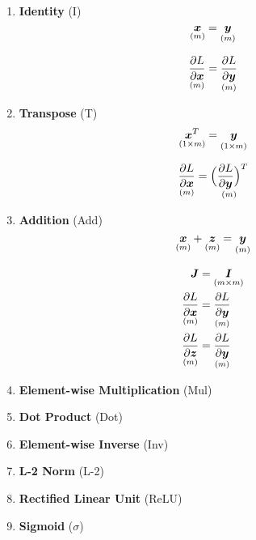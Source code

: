 \documentclass[9pt,twocolumn,times]{article}
\begin{document}
\begin{enumerate}[leftmargin=*]
\item \textbf{Identity} (I)
\begin{equation}
	\underset{(m)}{{\bm{x}}} = \underset{(m)}{{\bm{y}}}
\end{equation}
\begin{center}
	\resizebox{0.618\columnwidth}{!}{%
		
	}
\end{center}
\begin{equation}
	\underset{(m)}{\frac{\partial L}{\partial {\bm{x}}}} =
	\underset{(m)}{\frac{\partial L}{\partial {\bm{y}}}}
\end{equation}

\item \textbf{Transpose} (T)
\begin{equation}
	\underset{(1\times m)}{{\bm{x}}^T} = \underset{(1\times m)}{{\bm{y}}}
\end{equation}
\begin{center}
	\resizebox{0.618\columnwidth}{!}{%
		
	}
\end{center}
\begin{equation}
	\underset{(m)}{\frac{\partial L}{\partial {\bm{x}}}} =
	\underset{(m)}{\Big(\frac{\partial L}{\partial {\bm{y}}}\Big)^T}
\end{equation}

\item \textbf{Addition} (Add)
\begin{equation}
	\underset{(m)}{{\bm{x}}} + \underset{(m)}{{\bm{z}}} =
	\underset{(m)}{{\bm{y}}}
\end{equation}
\begin{center}
	\resizebox{0.618\columnwidth}{!}{%
		
	}
\end{center}
\begin{align}
	{\bm{J}} &= \underset{(m\times m)}{{\bm{I}}} \\
	\underset{(m)}{\frac{\partial L}{\partial {\bm{x}}}} &=
	\underset{(m)}{\frac{\partial L}{\partial {\bm{y}}}} \\
	\underset{(m)}{\frac{\partial L}{\partial {\bm{z}}}} &=
	\underset{(m)}{\frac{\partial L}{\partial {\bm{y}}}}
\end{align}

\item \textbf{Element-wise Multiplication} (Mul)

\item \textbf{Dot Product} (Dot)

\item \textbf{Element-wise Inverse} (Inv)

\item \textbf{L-2 Norm} (L-2)

\item \textbf{Rectified Linear Unit} (ReLU)

\item \textbf{Sigmoid} ($\sigma$)
\end{enumerate}
\end{document}
